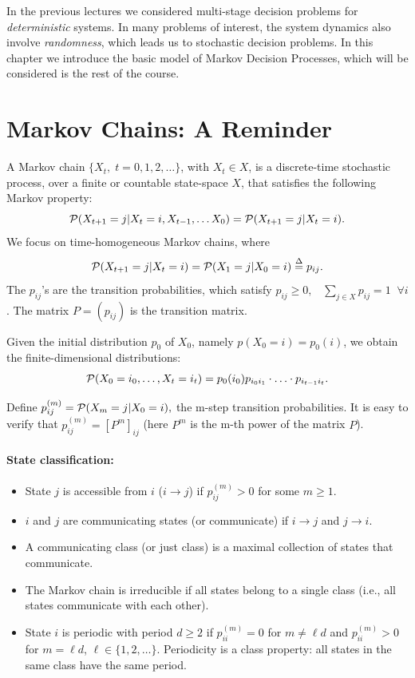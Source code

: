 
In the previous lectures we considered multi-stage decision problems for \emph{deterministic} systems. In many problems of interest, the system dynamics also involve \emph{randomness}, which leads us to stochastic decision problems. In this chapter we introduce the basic model of Markov Decision Processes, which will be considered is the rest of the course.
%

\section{Markov Chains: A Reminder}

A Markov chain $\{ {X_t},\;t = 0,1,2, \ldots \} $, with ${X_t} \in X$, is a discrete-time stochastic process, over a finite or countable state-space $X$, that satisfies the following Markov property:
	\[{\cal P}({X_{t + 1}} = j|{X_t} = i,{X_{t - 1}}, \ldots {X_0}) = {\cal P}({X_{t + 1}} = j|{X_t} = i).\]
We focus on time-homogeneous Markov chains, where
\[{\cal P}({X_{t + 1}} = j|{X_t} = i) = {\cal P}({X_1} = j|{X_0} = i) \buildrel \Delta \over = {p_{ij}}.\]
The ${p_{ij}}$'s  are the transition probabilities, which satisfy
${p_{ij}} \ge 0,\;\;\;\sum\nolimits_{j \in X} {{p_{ij}} = 1\;\;\forall i} $.
The matrix $P = ({p_{ij}})$ is the transition matrix.

Given the initial distribution ${p_0}$ of ${X_0}$, namely $p({X_0} = i) = {p_0}(i)$, we obtain the finite-dimensional distributions:
\[{\cal P}({X_0} = {i_0}, \ldots ,{X_t} = {i_t}) = {p_0}(i_0){p_{{i_0}{i_1}}} \cdot  \ldots  \cdot {p_{{i_{t - 1}}{i_t}}}.\]

Define $p_{ij}^{(m)} = {\cal P}({X_m} = j|{X_0} = i),$ the m-step transition probabilities.  It is easy to verify that $p_{ij}^{(m)} = {[{P^m}]_{ij}}$  (here ${P^m}$ is the m-th power of the matrix $P$).

\paragraph{State classification:}
\begin{itemize}
\item State $j$ is accessible from $i$  ($i \to j$) if $p_{ij}^{(m)} > 0$ for some $m \ge 1$.
\item $i$ and $j$ are communicating states (or communicate) if $i \to j$ and $j \to i$.
\item A communicating class (or just class) is a maximal collection of states that communicate.
\item The Markov chain is irreducible if all states belong to a single class (i.e., all states communicate with each other).
\item State $i$ is periodic with period $d \ge 2$ if  $p_{ii}^{(m)} = 0$ for $m \ne \ell d$ and  $p_{ii}^{(m)} > 0$ for $m = \ell d$, $\ell \in \{ 1,2, \ldots \}$. Periodicity is a class property: all states in the same class have the same period.
\end{itemize}

